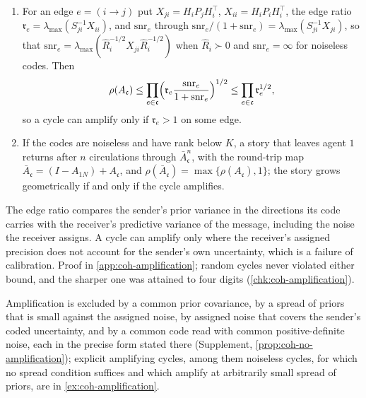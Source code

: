 \begin{theorem}\label{thm:coh-amplification}
\begin{enumerate}\renewcommand{\labelenumi}{(\alph{enumi})}
\item For an edge $e=(i\to j)$ put $X_{ji}=H_iP_jH_i^\top$, $X_{ii}=H_iP_iH_i^\top$, the edge ratio $\mathfrak r_e=\lambda_{\max}(S_{ji}^{-1}X_{ii})$, and $\mathrm{snr}_e$ through $\mathrm{snr}_e/(1+\mathrm{snr}_e)=\lambda_{\max}(S_{ji}^{-1}X_{ji})$, so that $\mathrm{snr}_e=\lambda_{\max}(\hat R_i^{-1/2}X_{ji}\hat R_i^{-1/2})$ when $\hat R_i\succ0$ and $\mathrm{snr}_e=\infty$ for noiseless codes. Then
\begin{equation}\label{eq:coh-edge-ratio}
\rho(A_{\mathfrak c})\le\prod_{e\in\mathfrak c}\Bigl(\mathfrak r_e\frac{\mathrm{snr}_e}{1+\mathrm{snr}_e}\Bigr)^{1/2}\le\prod_{e\in\mathfrak c}\mathfrak r_e^{1/2},
\end{equation}
so a cycle can amplify only if $\mathfrak r_e>1$ on some edge.
\item If the codes are noiseless and have rank below $K$, a story that leaves agent $1$ returns after $n$ circulations through $\bar A_{\mathfrak c}^n$, with the round-trip map $\bar A_{\mathfrak c}=(I-A_{1N})+A_{\mathfrak c}$, and $\rho(\bar A_{\mathfrak c})=\max\{\rho(A_{\mathfrak c}),1\}$; the story grows geometrically if and only if the cycle amplifies.
\end{enumerate}
\end{theorem}

The edge ratio compares the sender's prior variance in the directions its code carries with the receiver's predictive variance of the message, including the noise the receiver assigns. A cycle can amplify only where the receiver's assigned precision does not account for the sender's own uncertainty, which is a failure of calibration. Proof in \cref{app:coh-amplification}; random cycles never violated either bound, and the sharper one was attained to four digits (\cref{chk:coh-amplification}).

Amplification is excluded by a common prior covariance, by a spread of priors that is small against the assigned noise, by assigned noise that covers the sender's coded uncertainty, and by a common code read with common positive-definite noise, each in the precise form stated there (Supplement, \cref{prop:coh-no-amplification}); explicit amplifying cycles, among them noiseless cycles, for which no spread condition suffices and which amplify at arbitrarily small spread of priors, are in \cref{ex:coh-amplification}.

